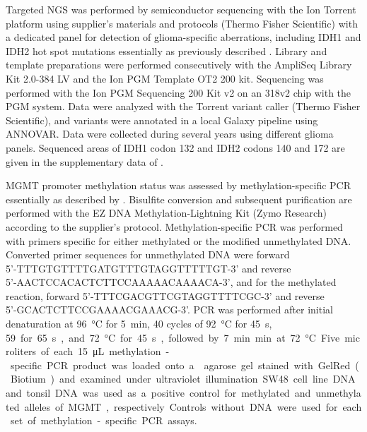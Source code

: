 Targeted \gls{NGS} was performed by semiconductor sequencing with the Ion Torrent platform using supplier's materials and protocols (Thermo Fisher Scientific) with a dedicated panel for detection of glioma-specific aberrations, including \gls{IDH}1 and \gls{IDH}2 hot spot mutations essentially as previously described \autocite{dubbink2015molecular}.
Library and template preparations were performed consecutively with the AmpliSeq Library Kit 2.0-384 LV and the Ion PGM Template OT2 200 kit.
Sequencing was performed with the Ion PGM Sequencing 200 Kit v2 on an 318v2 chip with the PGM system.
Data were analyzed with the Torrent variant caller (Thermo Fisher Scientific), and variants were annotated in a local Galaxy pipeline using ANNOVAR.
Data were collected during several years using different glioma panels.
Sequenced areas of \gls{IDH}1 codon 132 and \gls{IDH}2 codons 140 and 172 are given in the supplementary data of .

\gls{MGMT} promoter methylation status was assessed by methylation-specific PCR essentially as described by .
Bisulfite conversion and subsequent purification are performed with the EZ DNA Methylation-Lightning Kit (Zymo Research) according to the supplier's protocol.
Methylation-specific PCR was performed with primers specific for either methylated or the modified unmethylated DNA.
Converted primer sequences for unmethylated DNA were forward \\{5'-TTTGTGTTTTGATGTTTGTAGGTTTTTGT-3'} and reverse\\ {5'-AACTCCACACTCTTCCAAAAACAAAACA-3'}, and for the methylated reaction, forward {5'-TTTCGACGTTCGTAGGTTTTCGC-3'} and reverse\\ {5'-GCACTCTTCCGAAAACGAAACG-3'}.
PCR was performed after initial denaturation at \SI{96}{\celsius} for \SI{5}{\minute}, 40 cycles of \SI{92}{\celsius} for \SI{45}{\second}, \SI{59} for \SI{65}{\second}, and \SI{72}{\celsius} for \SI{45}{\second}, followed by \SI{7}{\minute} min at \SI{72}{\celsius}.
Five microliters of each \SI{15}{\micro\liter} methylation-specific PCR product was loaded onto a  agarose gel stained with GelRed (Biotium) and examined under ultraviolet illumination.
SW48 cell line DNA and tonsil DNA was used as a positive control for methylated and unmethylated alleles of \gls{MGMT}, respectively.
Controls without DNA were used for each set of methylation-specific PCR assays.

